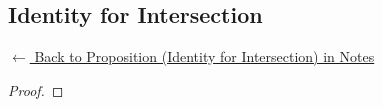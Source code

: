
\subsection*{Identity for Intersection}
\label{prf:identity-intersection}

\begin{remark*}[Return]
\hyperref[prop:identity-intersection]{$\leftarrow$ Back to Proposition (Identity for Intersection) in Notes}
\end{remark*}

\begin{proof}
\end{proof}

\begin{remark*}

\end{remark*}

\begin{remark*}[Dependencies]

\FlashUses{}
\end{remark*}
